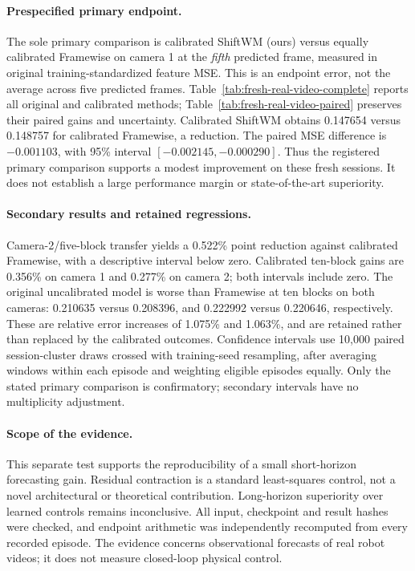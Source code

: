 \paragraph{Prespecified primary endpoint.}
The sole primary comparison is calibrated ShiftWM (ours) versus equally
calibrated Framewise on camera 1 at the \emph{fifth} predicted frame, measured
in original training-standardized feature MSE. This is an endpoint error,
not the average across five predicted frames. Table~\ref{tab:fresh-real-video-complete}
reports all original and calibrated methods; Table~\ref{tab:fresh-real-video-paired}
preserves their paired gains and uncertainty. Calibrated ShiftWM obtains
0.147654 versus 0.148757 for calibrated Framewise, a
 reduction. The paired MSE difference is $-0.001103$,
with 95\% interval $[-0.002145,-0.000290]$. Thus the registered primary
comparison supports a modest improvement on these fresh sessions. It does not
establish a large performance margin or state-of-the-art superiority.

\paragraph{Secondary results and retained regressions.}
Camera-2/five-block transfer yields a 0.522\% point reduction against calibrated
Framewise, with a descriptive interval below zero. Calibrated ten-block gains
are 0.356\% on camera 1 and 0.277\% on camera 2; both intervals include zero.
The original uncalibrated model is worse than Framewise at ten blocks on both
cameras: 0.210635 versus 0.208396, and 0.222992 versus 0.220646,
respectively. These are relative error increases of 1.075\% and 1.063\%,
and are retained rather than replaced by the calibrated outcomes.
Confidence intervals use 10,000 paired session-cluster draws crossed with
training-seed resampling, after averaging windows within each episode and
weighting eligible episodes equally. Only the stated primary comparison is
confirmatory; secondary intervals have no multiplicity adjustment.

\paragraph{Scope of the evidence.}
This separate test supports the reproducibility of a small short-horizon
forecasting gain. Residual contraction is a standard least-squares control,
not a novel architectural or theoretical contribution. Long-horizon superiority
over learned controls remains inconclusive. All input, checkpoint and result
hashes were checked, and endpoint arithmetic was independently recomputed from
every recorded episode. The evidence concerns observational forecasts of real
robot videos; it does not measure closed-loop physical control.

